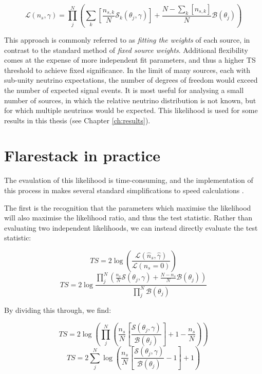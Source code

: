 \begin{equation}
	\mathcal{L}(n_{s}, \gamma) = \prod_{j}^{N} \left(\sum_{k} \left[ \frac{n_{s, k}}{N} \mathcal{S}_{k}(\theta_{j}, \gamma) \right]+ \frac{N - \sum_{k} \left[ n_{s, k} \right] }{N} \mathcal{B}(\theta_{j})  \right)
\end{equation}

This approach is commonly referred to as \emph{fitting the weights} of each source, in contrast to the standard method of \emph{fixed source weights}. Additional flexibility comes at the expense of more independent fit parameters, and thus a higher TS threshold to achieve fixed significance. In the limit of many sources, each with sub-unity neutrino expectations, the number of degrees of freedom would exceed the number of expected signal events. It is most useful for analysing a small number of sources, in which the relative neutrino distribution is not known, but for which multiple neutrinos would be expected. This likelihood is used for some results in this thesis (see Chapter \ref{ch:results}).

\section{Flarestack in practice}
The evaulation of this likelihood is time-consuming, and the implementation of this process in  \flarestack{} makes several standard simplifications to speed calculations . 


The first is the recognition that the parameters which maximise the likelihood will also maximise the likelihood ratio, and thus the test statistic. Rather than evaluating two independent likelihoods, we can instead directly evaluate the test statistic:

\begin{equation}
	TS = 2 \log \left( \frac{ \mathcal{L}(\hat{n}_{s}, \hat{\gamma}) }{\mathcal{L}(n_{s} = 0)} \right)
\end{equation}
\begin{equation}
TS = 2 \log  \frac{\prod_{j}^{N} \left(\frac{n_{s}}{N} \mathcal{S}(\theta_{j}, \gamma) + \frac{N - n_{s}}{N} \mathcal{B}(\theta_{j})  \right)}{\prod_{j}^{N}\mathcal{B}(\theta_{j})}
\end{equation}

By dividing this through, we find: 

\begin{equation}
	TS =  2 \log \left(  \prod_{j}^{N} \left(\frac{n_{s}}{N} \left[\frac{\mathcal{S}(\theta_{j}, \gamma)}{\mathcal{B}(\theta_{j})} \right] + 1 - \frac{n_{s}}{N} \right) \right) 
\end{equation}
\begin{equation}
	TS = 2 \sum_{j}^{N} \log \left(\frac{n_{s}}{N} \left[ \frac{\mathcal{S}(\theta_{j}, \gamma)}{\mathcal{B}(\theta_{j}) } - 1 \right] + 1 \right) 
\label{eq:TS_reduced}
\end{equation}


